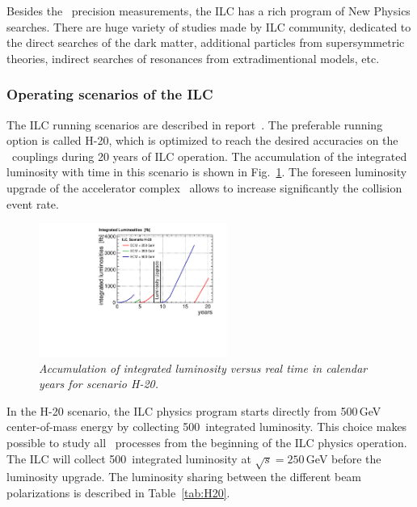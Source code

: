 
Besides the \sm\ precision measurements, the ILC has a rich program of New Physics searches. 
There are huge variety of studies made by ILC community, dedicated to the direct searches of the dark matter, additional particles from supersymmetric theories, indirect searches of resonances from extradimentional models, etc.

\subsubsection{Operating scenarios of the ILC}
\label{sec:ILCOperation}
The ILC running scenarios are described in report~\cite{bib:H20}. 
The preferable running option is called H-20, which is optimized to reach the desired accuracies on the \sm\ couplings during 20 years of ILC operation. 
The accumulation of the integrated luminosity with time in this scenario is shown in Fig.~\ref{fig:H20}.
The foreseen luminosity upgrade of the accelerator complex~\cite{bib:LumiUp} allows to  increase significantly the collision event rate. 

\begin{figure}
	{\centering
		\includegraphics[width=0.55\textwidth]{graphics/lumi_H-20.pdf}
		\caption{\sl Accumulation of integrated luminosity versus real time in calendar years for scenario H-20.}
		\label{fig:H20}
	}
\end{figure}
In the H-20 scenario, the ILC physics program starts directly from 500\,GeV center-of-mass energy by collecting 500\ifb\ integrated luminosity. This choice makes possible to study all \sm\ processes from the beginning of the ILC physics operation.
The ILC will collect 500\ifb\ integrated luminosity at $\sqrt{s} = 250$\,GeV before the luminosity upgrade.
The luminosity sharing between the different beam polarizations is described in Table~\ref{tab:H20}. 

